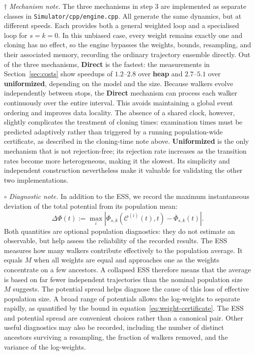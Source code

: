 \documentclass[11pt]{article}
\begin{document}
\medskip
\noindent$\boldsymbol{\dagger}$\textit{ Mechanism note.}
The three mechanisms in step 3 are implemented as separate classes in \texttt{Simulator/cpp/engine.cpp}. All generate the same dynamics, but at different speeds. Each provides both a general weighted loop and a specialised loop for $s=k=0$. In this unbiased case, every weight remains exactly one and cloning has no effect, so the engine bypasses the weights, bounds, resampling, and their associated memory, recording the ordinary trajectory ensemble directly. Out of the three mechanisms, \textcolor{dircol}{\textbf{Direct}} is the fastest: the measurements in Section~\ref{sec:costs} show speedups of $1.2$--$2.8$ over \textcolor{heapcol}{\textbf{heap}} and $2.7$--$5.1$ over \textcolor{unifcol}{\textbf{uniformized}}, depending on the model and the size. Because walkers evolve independently between stops, the \textcolor{dircol}{\textbf{Direct}} mechanism can process each walker continuously over the entire interval. This avoids maintaining a global event ordering and improves data locality. The absence of a shared clock, however, slightly complicates the treatment of cloning times: examination times must be predicted adaptively rather than triggered by a running population-wide certificate, as described in the cloning-time note above. \textcolor{unifcol}{\textbf{Uniformized}} is the only mechanism that is not rejection-free; its rejection rate increases as the transition rates become more heterogeneous, making it the slowest. Its simplicity and independent construction nevertheless make it valuable for validating the other two implementations.

\medskip
\noindent$\boldsymbol{\circ}$\textit{ Diagnostic note.}
In addition to the ESS, we record the maximum instantaneous deviation of the total potential from its population mean:
\begin{equation}
    \Delta\Phi(t):=\max_i\left|
      \Phi_{s,k}(\mathcal{C}^{(i)}(t),t)-\overline{\Phi}_{s,k}(t)
    \right|.
    \label{eq:potential-spread}
\end{equation}
Both quantities are optional population diagnostics: they do not estimate an observable, but help assess the reliability of the recorded results. The ESS measures how many walkers contribute effectively to the population average. It equals $M$ when all weights are equal and approaches one as the weights concentrate on a few ancestors. A collapsed ESS therefore means that the average is based on far fewer independent trajectories than the nominal population size $M$ suggests. The potential spread helps diagnose the cause of this loss of effective population size. A broad range of potentials allows the log-weights to separate rapidly, as quantified by the bound in equation~\ref{eq:weight-certificate}. The ESS and potential spread are convenient choices rather than a canonical pair. Other useful diagnostics may also be recorded, including the number of distinct ancestors surviving a resampling, the fraction of walkers removed, and the variance of the log-weights.
\end{document}
